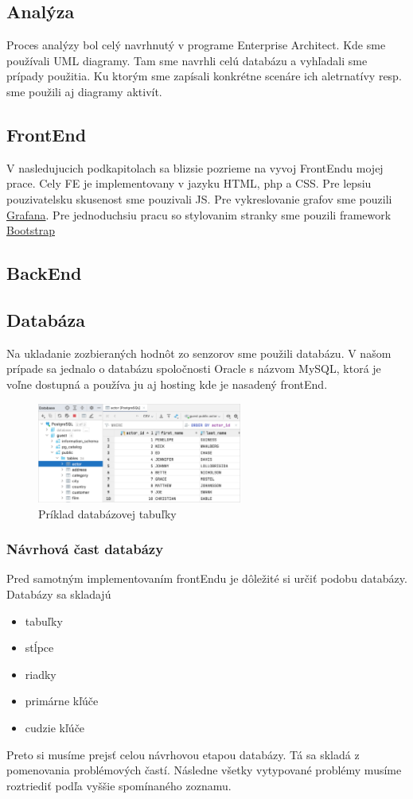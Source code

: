 \subsection{Analýza}
Proces analýzy bol celý navrhnutý v programe Enterprise Architect. Kde sme používali \acs{UML} diagramy. Tam sme navrhli celú databázu a vyhľadali sme prípady použitia. Ku ktorým sme zapísali konkrétne scenáre ich aletrnatívy resp. sme použili aj diagramy aktivít. 
\subsection{FrontEnd}
V nasledujucich podkapitolach sa blizsie pozrieme na vyvoj FrontEndu mojej prace. Cely \acs{FE} je implementovany v jazyku \acs{HTML}, \acs{php} a \acs{CSS}. Pre lepsiu pouzivatelsku skusenost sme pouzivali \acl{JS}. Pre vykreslovanie grafov sme pouzili \href{https://grafana.com/}{Grafana}. Pre jednoduchsiu pracu so stylovanim stranky sme pouzili framework \href{https://getbootstrap.com/}{Bootstrap}


\subsection{BackEnd}

\subsection{Databáza}
Na ukladanie zozbieraných hodnôt zo senzorov sme použili databázu. V našom prípade sa jednalo o databázu spoločnosti Oracle s názvom MySQL, ktorá je voľne dostupná a používa ju aj hosting kde je nasadený frontEnd.
\begin{figure}[h!]
    \centering
    \includegraphics[width=0.6\textwidth]{obrazky/Table.png}
    \caption{Príklad databázovej tabuľky}
\end{figure}

\subsubsection{Návrhová čast databázy}
Pred samotným implementovaním frontEndu je dôležité si určiť podobu databázy. Databázy sa skladajú
\begin{itemize}
    \item tabuľky   
     \item stĺpce
     \item riadky
     \item primárne kľúče
     \item cudzie kľúče
\end{itemize} 
Preto si musíme prejsť celou návrhovou etapou databázy. Tá sa skladá z pomenovania problémových častí. Následne všetky vytypované problémy musíme roztriediť podľa vyššie spomínaného zoznamu.